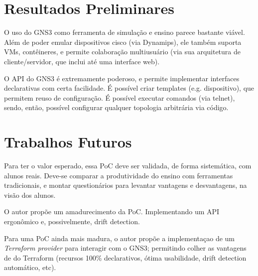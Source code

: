 \documentclass[12pt]{article}
\begin{document}
\section{Resultados Preliminares}

O uso do GNS3 como ferramenta de simulação e ensino parece bastante viável.
Além de poder emular dispositivos cisco (via Dynamips), ele também suporta VMs,
contêineres, e permite colaboração multiusuário (via sua arquitetura de
cliente/servidor, que inclui até uma interface web).

O API do GNS3 é extremamente poderoso, e permite implementar interfaces
declarativas com certa facilidade. É possível criar templates (e.g.
dispositivo), que permitem reuso de configuração. É possível executar comandos
(via telnet), sendo, então, possível configurar qualquer topologia arbitrária
via código.

\section{Trabalhos Futuros}

Para ter o valor esperado, essa PoC deve ser validada, de forma sistemática,
com alunos reais. Deve-se comparar a produtividade do ensino com ferramentas
tradicionais, e montar questionários para levantar vantagens e desvantagens, na
visão dos alunos.

O autor propõe um amadurecimento da PoC. Implementando um API ergonômico e,
possivelmente, drift detection.

Para uma PoC ainda mais madura, o autor propõe a implementaçao de um
\textit{Terraform provider} para interagir com o GNS3; permitindo colher as
vantagens de do Terraform (recursos 100\% declarativos, ótima usabilidade,
drift detection automático, etc).



\end{document}
